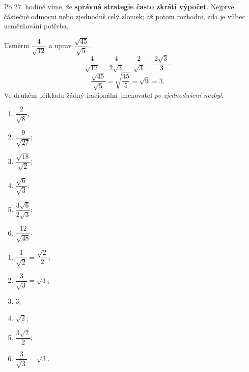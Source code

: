 \documentclass[11pt,a4paper]{article}
\begin{document}
Po 27. hodině víme, že \textbf{správná strategie často zkrátí výpočet}.
Nejprve částečně odmocni nebo zjednoduš celý zlomek; až potom
rozhodni, zda je vůbec usměrňování potřeba.
\begin{prikladReseniBox}[breakable=false,title={Příklad 2}]
Usměrni $\dfrac4{\sqrt{12}}$ a uprav $\dfrac{\sqrt{45}}{\sqrt5}$.
\tcblower
\[
\frac4{\sqrt{12}}=\frac4{2\sqrt3}=\frac2{\sqrt3}
=\boxed{\frac{2\sqrt3}{3}}.
\]
\[
\frac{\sqrt{45}}{\sqrt5}=\sqrt{\frac{45}{5}}=\sqrt9=\boxed3.
\]
Ve druhém příkladu žádný iracionální jmenovatel \emph{po zjednodušení nezbyl}.
\end{prikladReseniBox}
\begin{zadaniReseniBox}[breakable=false,title={Samostatná práce 2}]
\begin{enumerate}[label=\alph*)]
\item $\dfrac2{\sqrt8}$; \item $\dfrac9{\sqrt{27}}$;
\item $\dfrac{\sqrt{18}}{\sqrt2}$;
\item $\dfrac{\sqrt6}{\sqrt3}$;
\item $\dfrac{3\sqrt6}{2\sqrt3}$;
\item $\dfrac{12}{\sqrt{48}}$.
\end{enumerate}
\tcblower
\begin{enumerate}[label=\alph*)]
\item $\dfrac1{\sqrt2}=\dfrac{\sqrt2}{2}$;
\item $\dfrac3{\sqrt3}=\sqrt3$;
\item $3$; \item $\sqrt2$;
\item $\dfrac{3\sqrt2}2$;
\item $\dfrac3{\sqrt3}=\sqrt3$.
\end{enumerate}
\end{zadaniReseniBox}
\end{document}
